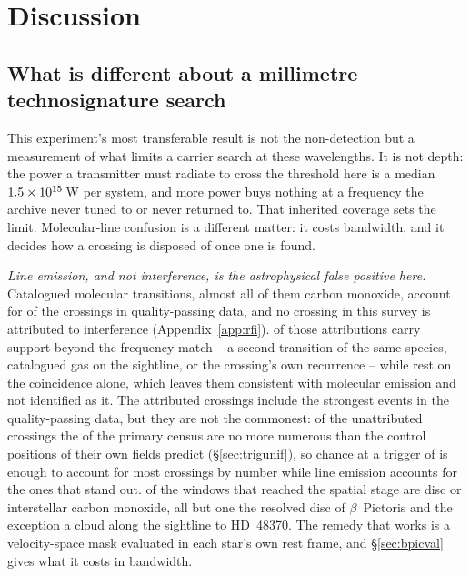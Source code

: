 \section{Discussion}
\label{sec:discussion}

\subsection{What is different about a millimetre technosignature search}
\label{sec:mmdifferent}

This experiment's most transferable result is not the non-detection but
a measurement of what limits a carrier search at these wavelengths. It is not
depth: the power a transmitter must radiate to cross the threshold here is a median
$1.5\times10^{15}$\,W per system, and more power buys nothing at a
frequency the archive never tuned to or never returned to. That
inherited coverage sets the limit. Molecular-line confusion is a different
matter: it costs bandwidth, and it decides how a crossing is disposed of once
one is found.

\emph{Line emission, and not interference, is the astrophysical false
positive here.}
Catalogued molecular transitions, almost all of them carbon monoxide, account
for \EvNAttrQp{} of the \EvNCrossQp{} crossings in quality-passing data, and
no crossing in this survey is attributed to interference
(Appendix~\ref{app:rfi}). \LnAttrSupp{} of those attributions carry support
beyond the frequency match -- a second transition of the same species,
catalogued gas on the sightline, or the crossing's own recurrence -- while
\LnAttrCoincWord{} rest on the coincidence alone, which leaves them
consistent with molecular emission and not identified as it. The
attributed crossings include the strongest events in the quality-passing
data, but they are
not the commonest: of the \EvNUnattrQp{} unattributed crossings the \CeObs{}
of the primary census are no more numerous than the control positions of
their own fields predict
(\S\ref{sec:trigunif}), so chance at a trigger of \StageNullTrig{} is enough
to account for most crossings by number while line emission accounts for the
ones that stand out.
\DiscFpWin{} of the \DiscFpOfFlags{} windows that reached the spatial stage
are disc or interstellar carbon monoxide, all but one the resolved disc of
$\beta$~Pictoris and the exception a cloud along the sightline to
HD~48370. The remedy that works is a velocity-space mask evaluated in each star's
own rest frame, and \S\ref{sec:bpicval} gives what it costs in
bandwidth.

